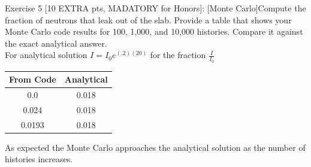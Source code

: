 \documentclass[12pt,fleqn, parskip=full]{scrartcl}
\begin{document}
Exercise 5 [10 EXTRA pts, MADATORY for Honors]: [Monte Carlo]Compute the fraction of neutrons that leak out of the slab. Provide a table that shows your Monte Carlo code results for 100, 1,000, and 10,000 histories. Compare it against the exact analytical answer.\\
For analytical solution $I=I_0e^{(.2)(20)}$ for the fraction $\frac{I}{I_0}$\\
\begin{table}[H]
\small
\begin{center}
{\begin{tabular}{|c|c|}
\hline
From Code & Analytical\\
\hline
0.0 & 0.018\\
\hline
0.024 & 0.018\\
\hline
0.0193 & 0.018\\
\hline
\end{tabular}}
\end{center}
\end{table}
As expected the Monte Carlo approaches the analytical solution as the number of histories increases.
\end{document}
